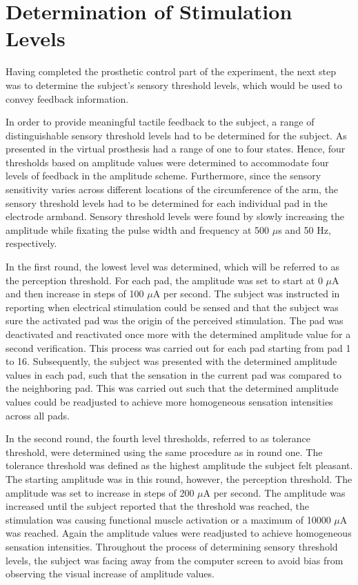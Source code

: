 
\section{Determination of Stimulation Levels}

Having completed the prosthetic control part of the experiment, the next step was to determine the subject's sensory threshold levels, which would be used to convey feedback information.

In order to provide meaningful tactile feedback to the subject, a range of distinguishable sensory threshold levels had to be determined for the subject. As presented in  the virtual prosthesis had a range of one to four states. Hence, four thresholds based on amplitude values were determined to accommodate four levels of feedback in the amplitude scheme. Furthermore, since the sensory sensitivity varies across different locations of the circumference of the arm, the sensory threshold levels had to be determined for each individual pad in the electrode armband. Sensory threshold levels were found by slowly increasing the amplitude while fixating the pulse width and frequency at 500 $\mu$s and 50 Hz, respectively. 

In the first round, the lowest level was determined, which will be referred to as the perception threshold. For each pad, the amplitude was set to start at 0 $\mu $A and then increase in steps of 100 $\mu$A per second. The subject was instructed in reporting when electrical stimulation could be sensed and that the subject was sure the activated pad was the origin of the perceived stimulation. The pad was deactivated and reactivated once more with the determined amplitude value for a second verification. This process was carried out for each pad starting from pad 1 to 16. Subsequently, the subject was presented with the determined amplitude values in each pad, such that the sensation in the current pad was compared to the neighboring pad. This was carried out such that the determined amplitude values could be readjusted to achieve more homogeneous sensation intensities across all pads.  

In the second round, the fourth level thresholds, referred to as tolerance threshold, were determined using the same procedure as in round one. The tolerance threshold was defined as the highest amplitude the subject felt pleasant. The starting amplitude was in this round, however, the perception threshold. The amplitude was set to increase in steps of 200 $\mu$A per second. The amplitude was increased until the subject reported that the threshold was reached, the stimulation was causing functional muscle activation or a maximum of 10000 $\mu$A was reached. Again the amplitude values were readjusted to achieve homogeneous sensation intensities. Throughout the process of determining sensory threshold levels, the subject was facing away from the computer screen to avoid bias from observing the visual increase of amplitude values.  

